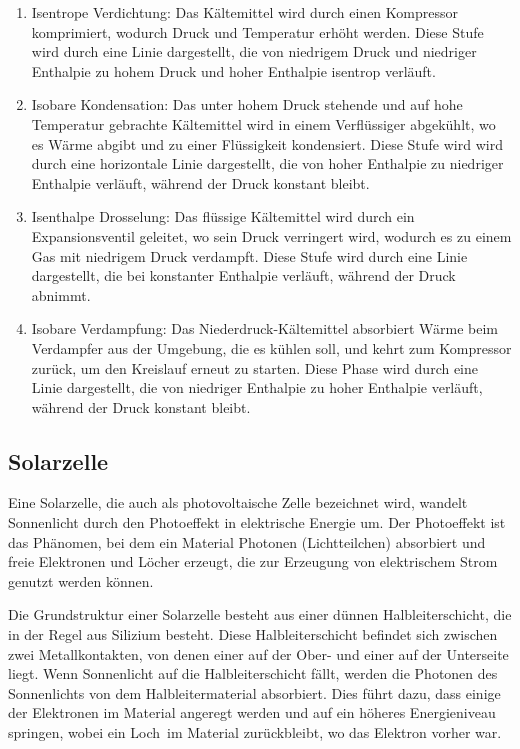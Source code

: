 \documentclass[12pt,english,ngerman]{scrartcl}
\begin{document}
\begin{enumerate}
	\item Isentrope Verdichtung: Das Kältemittel wird durch einen Kompressor komprimiert,
	      wodurch Druck und Temperatur erhöht werden. Diese Stufe wird durch eine Linie
	      dargestellt, die von niedrigem Druck und niedriger Enthalpie zu hohem Druck und
	      hoher Enthalpie isentrop verläuft.
	\item Isobare Kondensation: Das unter hohem Druck stehende und auf hohe Temperatur
	      gebrachte Kältemittel wird in einem Verflüssiger abgekühlt, wo es Wärme abgibt
	      und zu einer Flüssigkeit kondensiert. Diese Stufe wird wird durch eine
	      horizontale Linie dargestellt, die von hoher Enthalpie zu niedriger Enthalpie
	      verläuft, während der Druck konstant bleibt.
	\item Isenthalpe Drosselung: Das flüssige Kältemittel wird durch ein Expansionsventil
	      geleitet, wo sein Druck verringert wird, wodurch es zu einem Gas mit niedrigem
	      Druck verdampft. Diese Stufe wird durch eine Linie dargestellt, die bei
	      konstanter Enthalpie verläuft, während der Druck abnimmt.
	\item Isobare Verdampfung: Das Niederdruck-Kältemittel absorbiert Wärme beim
	      Verdampfer aus der Umgebung, die es kühlen soll, und kehrt zum Kompressor
	      zurück, um den Kreislauf erneut zu starten. Diese Phase wird durch eine Linie
	      dargestellt, die von niedriger Enthalpie zu hoher Enthalpie verläuft, während
	      der Druck konstant bleibt.
\end{enumerate}

\subsection{Solarzelle}
Eine Solarzelle, die auch als photovoltaische Zelle bezeichnet wird, wandelt
Sonnenlicht durch den Photoeffekt in elektrische Energie um. Der Photoeffekt
ist das Phänomen, bei dem ein Material Photonen (Lichtteilchen) absorbiert und
freie Elektronen und Löcher erzeugt, die zur Erzeugung von elektrischem Strom
genutzt werden können.

Die Grundstruktur einer Solarzelle besteht aus einer dünnen Halbleiterschicht,
die in der Regel aus Silizium besteht. Diese Halbleiterschicht befindet sich
zwischen zwei Metallkontakten, von denen einer auf der Ober- und einer auf der
Unterseite liegt. Wenn Sonnenlicht auf die Halbleiterschicht fällt, werden die
Photonen des Sonnenlichts von dem Halbleitermaterial absorbiert. Dies führt
dazu, dass einige der Elektronen im Material angeregt werden und auf ein
höheres Energieniveau springen, wobei ein \dq Loch\dq \ im Material
zurückbleibt, wo das Elektron vorher war.
\end{document}
